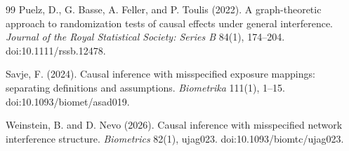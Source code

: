 \documentclass[11pt]{article}
\theoremstyle{definition}
\theoremstyle{plain}
\theoremstyle{remark}
\begin{document}
\begin{thebibliography}{99}
Puelz, D., G. Basse, A. Feller, and P. Toulis (2022).
A graph-theoretic approach to randomization tests of causal effects under
general interference.
\emph{Journal of the Royal Statistical Society: Series B} 84(1), 174--204.
doi:10.1111/rssb.12478.

Savje, F. (2024).
Causal inference with misspecified exposure mappings: separating definitions
and assumptions.
\emph{Biometrika} 111(1), 1--15.
doi:10.1093/biomet/asad019.

Weinstein, B. and D. Nevo (2026).
Causal inference with misspecified network interference structure.
\emph{Biometrics} 82(1), ujag023.
doi:10.1093/biomtc/ujag023.
\end{thebibliography}
\end{document}
